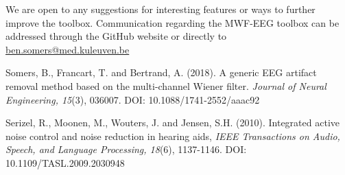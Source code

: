 \documentclass[11pt]{article}
\begin{document}
We are open to any suggestions for interesting features or ways to further improve the toolbox. Communication regarding the MWF-EEG toolbox can be addressed through the GitHub website or directly to \href{mailto:ben.somers@med.kuleuven.be}{ben.somers@med.kuleuven.be}

\begin{thebibliography}{9}

  Somers, B., Francart, T. and Bertrand, A. (2018).
  A generic EEG artifact removal method based on the multi-channel Wiener filter.
  \textit{Journal of Neural Engineering, 15}(3), 036007. 
  DOI: 10.1088/1741-2552/aaac92
  
  Serizel, R., Moonen, M., Wouters, J. and Jensen, S.H. (2010).
  Integrated active noise control and noise reduction in hearing aids, 
  \textit{IEEE Transactions on Audio, Speech, and Language Processing, 18}(6),
  1137-1146.
  DOI: 10.1109/TASL.2009.2030948

\end{thebibliography}
\end{document}
